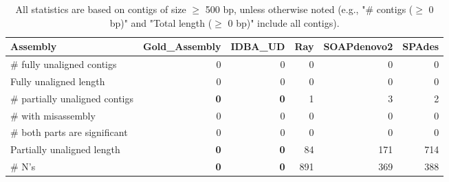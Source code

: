 \documentclass[12pt,a4paper]{article}
\begin{document}
\begin{table}[ht]
\begin{center}
\caption{All statistics are based on contigs of size $\geq$ 500 bp, unless otherwise noted (e.g., "\# contigs ($\geq$ 0 bp)" and "Total length ($\geq$ 0 bp)" include all contigs).}
\begin{tabular}{|l*{5}{|r}|}
\hline
Assembly & Gold\_Assembly & IDBA\_UD & Ray & SOAPdenovo2 & SPAdes \\ \hline
\# fully unaligned contigs & 0 & 0 & 0 & 0 & 0 \\ \hline
Fully unaligned length & 0 & 0 & 0 & 0 & 0 \\ \hline
\# partially unaligned contigs & {\bf 0} & {\bf 0} & 1 & 3 & 2 \\ \hline
\hspace{5mm}\# with misassembly & 0 & 0 & 0 & 0 & 0 \\ \hline
\hspace{5mm}\# both parts are significant & 0 & 0 & 0 & 0 & 0 \\ \hline
Partially unaligned length & {\bf 0} & {\bf 0} & 84 & 171 & 714 \\ \hline
\# N's & {\bf 0} & {\bf 0} & 891 & 369 & 388 \\ \hline
\end{tabular}
\end{center}
\end{table}
\end{document}
